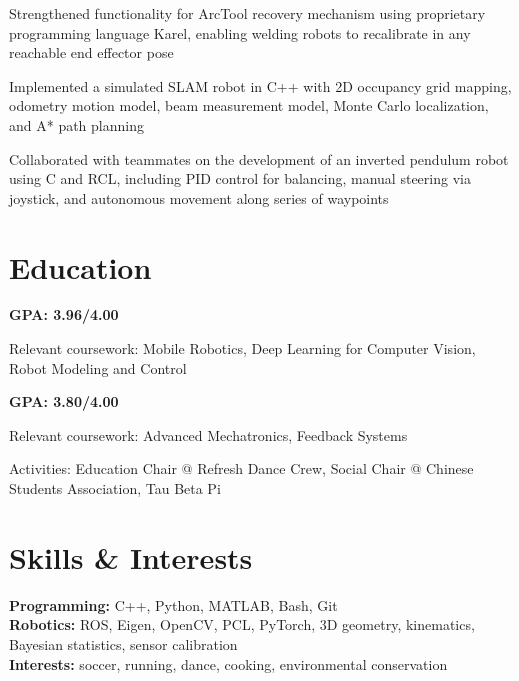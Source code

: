 \documentclass{resume}
\begin{document}
\begin{details}
    \item Strengthened functionality for ArcTool recovery mechanism using proprietary programming language Karel, enabling welding robots to recalibrate in any reachable end effector pose
\end{details}

\begin{details}
    \item Implemented a simulated SLAM robot in C++ with 2D occupancy grid mapping, odometry motion model, beam measurement model, Monte Carlo localization, and A* path planning
    \item Collaborated with teammates on the development of an inverted pendulum robot using C and RCL, including PID control for balancing, manual steering via joystick, and autonomous movement along series of waypoints
\end{details}

\section{Education}

\begin{details}
    \item \textbf{GPA: 3.96/4.00}
    \item Relevant coursework: Mobile Robotics, Deep Learning for Computer Vision, Robot Modeling and Control
\end{details}

\begin{details}
    \item \textbf{GPA: 3.80/4.00}
    \item Relevant coursework: Advanced Mechatronics, Feedback Systems
    \item Activities: Education Chair @ Refresh Dance Crew, Social Chair @ Chinese Students Association, Tau Beta Pi
\end{details}

\section{Skills \& Interests}
\textbf{Programming:} C++, Python, MATLAB, Bash, Git \\
\textbf{Robotics:} ROS, Eigen, OpenCV, PCL, PyTorch, 3D geometry, kinematics, Bayesian statistics, sensor calibration \\
\textbf{Interests:} soccer, running, dance, cooking, environmental conservation
\end{document}

